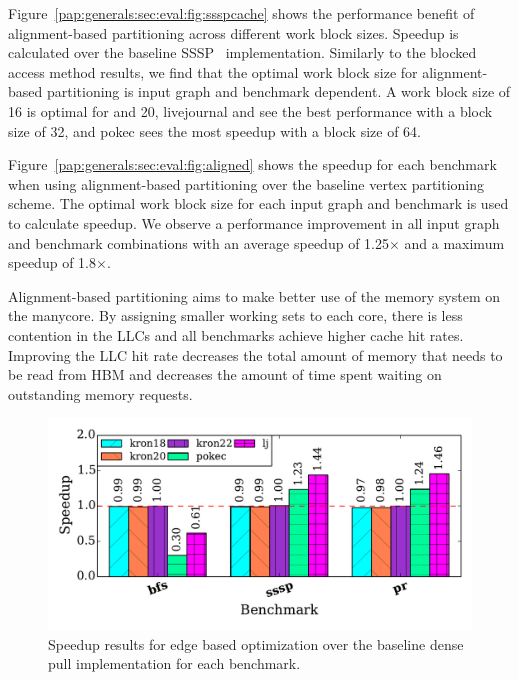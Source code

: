 Figure~\ref{pap:generals:sec:eval:fig:ssspcache} shows the performance benefit of alignment-based partitioning across different work block sizes.
Speedup is calculated over the baseline SSSP \pull~implementation. 
Similarly to the blocked access method results, we find that the optimal work block size for alignment-based partitioning is input graph and benchmark dependent. 
A work block size of 16 is optimal for  and 20, livejournal and  see the best performance with a block size of 32, and pokec sees the most speedup with a block size of 64.
 
Figure~\ref{pap:generals:sec:eval:fig:aligned} shows the speedup for each benchmark when using alignment-based partitioning over the baseline vertex partitioning scheme. The optimal work block size for each input graph and benchmark is used to calculate speedup. 
We observe a performance improvement in all input graph and benchmark combinations with an average speedup of 1.25$\times$ and a maximum speedup of 1.8$\times$. 
 
Alignment-based partitioning aims to make better use of the memory system on the manycore. 
By assigning smaller working sets to each core, there is less contention in the LLCs and all benchmarks achieve higher cache hit rates. 
Improving the LLC hit rate decreases the total amount of memory that needs to be read from HBM and decreases the amount of time spent waiting on outstanding memory requests.
 
 
\begin{figure}[t]
    \centering
    \includegraphics[scale = 0.5]{graphit-figures/edge.pdf}
    \caption{Speedup results for edge based optimization over the baseline dense pull implementation for each benchmark.}
    \label{pap:generals:sec:eval:fig:edge}
    \vspace{-2mm} 
\end{figure}
 
